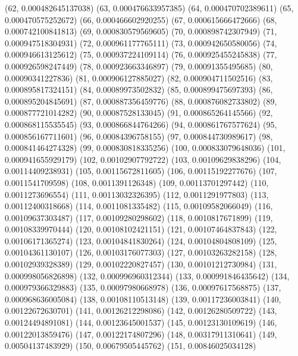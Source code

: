 {					(62, 0.000482645137038)
					(63, 0.000476633957385)
					(64, 0.000470702389611)
					(65, 0.000470575252672)
					(66, 0.000466602920255)
					(67, 0.000615666472666)
					(68, 0.000742100841813)
					(69, 0.000830579569605)
					(70, 0.000898742307949)
					(71, 0.000947518304931)
					(72, 0.000961177765111)
					(73, 0.000942650580056)
					(74, 0.000946613125612)
					(75, 0.000937224109114)
					(76, 0.000925455245838)
					(77, 0.000926598247449)
					(78, 0.000923663346897)
					(79, 0.00091355495685)
					(80, 0.00090341227836)
					(81, 0.000906127885027)
					(82, 0.000904711502516)
					(83, 0.000895817324151)
					(84, 0.00089973502832)
					(85, 0.000899475697393)
					(86, 0.000895204845691)
					(87, 0.000887356459776)
					(88, 0.000876082733802)
					(89, 0.000877721014282)
					(90, 0.00087528133045)
					(91, 0.000865264145566)
					(92, 0.000868115535545)
					(93, 0.000866844764266)
					(94, 0.000861767577624)
					(95, 0.000856167711601)
					(96, 0.00084396758155)
					(97, 0.000844730989617)
					(98, 0.000841464274328)
					(99, 0.000830818335256)
					(100, 0.000833079648036)
					(101, 0.000941655929179)
					(102, 0.00102907792722)
					(103, 0.00109629838296)
					(104, 0.00114409238931)
					(105, 0.00115672811605)
					(106, 0.00115192277676)
					(107, 0.0011541709598)
					(108, 0.0011391126348)
					(109, 0.00113701297442)
					(110, 0.0011273696554)
					(111, 0.00113032326395)
					(112, 0.0011291977803)
					(113, 0.00112400318668)
					(114, 0.0011081335482)
					(115, 0.00109582066049)
					(116, 0.00109637303487)
					(117, 0.00109280298602)
					(118, 0.0010817671899)
					(119, 0.00108339970444)
					(120, 0.00108102421151)
					(121, 0.00107464837843)
					(122, 0.00106171365274)
					(123, 0.00104841830264)
					(124, 0.00104804808109)
					(125, 0.00104361130107)
					(126, 0.00103176077303)
					(127, 0.00103263282158)
					(128, 0.00102939328389)
					(129, 0.00102220827457)
					(130, 0.00101212730984)
					(131, 0.000998056826898)
					(132, 0.000996960312344)
					(133, 0.000991846435642)
					(134, 0.000979366329883)
					(135, 0.00097980668978)
					(136, 0.00097617568875)
					(137, 0.000968636005084)
					(138, 0.00108110513148)
					(139, 0.00117236003841)
					(140, 0.00122672630701)
					(141, 0.00126212298086)
					(142, 0.00126280509722)
					(143, 0.00124494891081)
					(144, 0.00123645001537)
					(145, 0.00123130109619)
					(146, 0.00122013859476)
					(147, 0.00122174807296)
					(148, 0.00317911310641)
					(149, 0.00504137483929)
					(150, 0.00679505445762)
					(151, 0.00846025034128)
}
